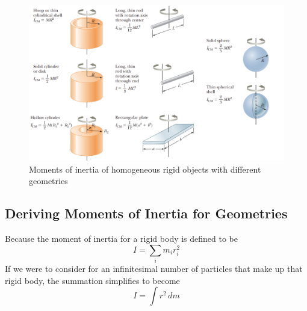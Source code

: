 \begin{figure}[ht!]
    \centering
    \includegraphics[width= \textwidth]{../figures/moments of inertia.png}
    \caption{Moments of inertia of homogeneous rigid objects with different geometries}
    \label{fig:moments-of-inertia}
\end{figure}

\subsection{Deriving Moments of Inertia for Geometries}
Because the moment of inertia for a rigid body is defined to be
\[
    I=\sum_im_ir_i^2
\]
If we were to consider for an infinitesimal number of particles that make up that rigid body, the
summation simplifies to become
\[
    I=\int r^2\,dm
\]


